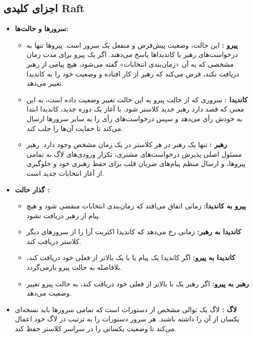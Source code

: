 \documentclass[12pt,a4paper]{article}
\begin{document}
\subsection{اجزای کلیدی Raft}

\begin{itemize}
    \item \textbf{سرورها و حالت‌ها:}
    \begin{itemize}
        \item \textbf{پیرو :} این حالت، وضعیت پیش‌فرض و منفعل یک سرور است. پیروها تنها به درخواست‌های رهبر یا کاندیداها پاسخ می‌دهند. اگر یک پیرو برای مدت زمان مشخصی که به آن «زمان‌بندی انتخابات»  گفته می‌شود، هیچ پیامی از رهبر دریافت نکند، فرض می‌کند که رهبر از کار افتاده و وضعیت خود را به کاندیدا تغییر می‌دهد.
        \item \textbf{کاندیدا :} سروری که از حالت پیرو به این حالت تغییر وضعیت داده است، به این معنی که قصد دارد رهبر جدید کلاستر شود. با آغاز یک دوره  جدید، کاندیدا ابتدا به خودش رأی می‌دهد و سپس درخواست‌های رأی  را به سایر سرورها ارسال می‌کند تا حمایت آن‌ها را جلب کند.
        \item \textbf{رهبر :} تنها یک رهبر در هر کلاستر  در یک زمان مشخص وجود دارد. رهبر مسئول اصلی پذیرش درخواست‌های مشتری، تکرار ورودی‌های لاگ به تمامی پیروها، و ارسال منظم پیام‌های ضربان قلب  برای حفظ رهبری خود و جلوگیری از آغاز انتخابات جدید است.
    \end{itemize}
    \item \textbf{گذار حالت :}
    \begin{itemize}
        \item \textbf{پیرو به کاندیدا:} زمانی اتفاق می‌افتد که زمان‌بندی انتخابات منقضی شود و هیچ پیام  از رهبر دریافت نشود.
        \item \textbf{کاندیدا به رهبر:} زمانی رخ می‌دهد که کاندیدا اکثریت آرا را از سرورهای دیگر کلاستر دریافت کند.
        \item \textbf{کاندیدا به پیرو:} اگر کاندیدا یک پیام  یا  با یک  بالاتر از  فعلی خود دریافت کند، بلافاصله به حالت پیرو بازمی‌گردد.
        \item \textbf{رهبر به پیرو:} اگر رهبر یک  با  بالاتر از  فعلی خود دریافت کند، به حالت پیرو تغییر وضعیت می‌دهد.
    \end{itemize}
    \item \textbf{لاگ :} لاگ یک توالی مشخص از دستورات  است که تمامی سرورها باید نسخه‌ای یکسان از آن را داشته باشند. هر سرور دستورات را به ترتیب در لاگ خود اعمال می‌کند تا وضعیت یکسانی را در سراسر کلاستر حفظ کند.

\end{itemize}
\end{document}
